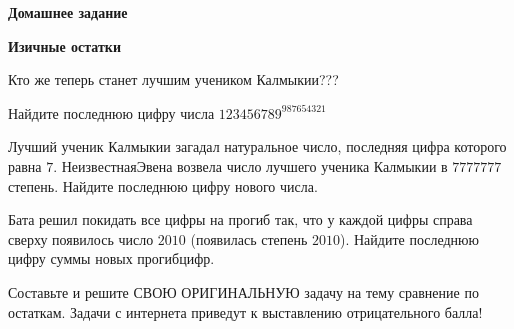 \hspace{3mm}

\centerline{\bf \Huge Домашнее задание}
\centerline{\bf \Huge Изичные остатки}

\begin{flushright}
    \scriptsize{Кто же теперь станет лучшим учеником Калмыкии???}
\end{flushright}

 Найдите последнюю цифру числа $123456789^{987654321}$

 Лучший ученик Калмыкии загадал натуральное число, последняя цифра которого равна $7$. НеизвестнаяЭвена возвела число лучшего ученика Калмыкии в $7777777$ степень. Найдите последнюю цифру нового числа.

 Бата решил покидать все цифры на прогиб так, что у каждой цифры справа сверху появилось число $2010$ (появилась степень $2010$). Найдите последнюю цифру суммы новых прогибцифр.

 Составьте и решите СВОЮ ОРИГИНАЛЬНУЮ задачу на тему сравнение по остаткам. Задачи с интернета приведут к выставлению отрицательного балла!